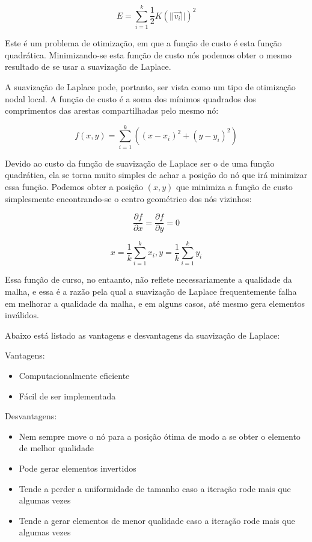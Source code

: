 \begin{equation*}
    E = \sum_{i=1}^k \frac{1}{2} K (||\vec{v_i}||)^2
\end{equation*}

Este é um problema de otimização, em que a função de custo é esta função quadrática. Minimizando-se esta função de custo nós podemos obter o mesmo resultado de se usar a suavização de Laplace.


A suavização de Laplace pode, portanto, ser vista como um tipo de otimização nodal local. A função de custo é a soma dos mínimos quadrados dos comprimentos das arestas compartilhadas pelo mesmo nó:

\begin{equation*}
    f(x,y) = \sum_{i=1}^k ((x-x_i)^2 + (y-y_i)^2)
\end{equation*}

Devido ao custo da função de suavização de Laplace ser o de uma função quadrática, ela se torna muito simples de achar a posição do nó que irá minimizar essa função. Podemos obter a posição $(x,y)$ que minimiza a função de custo simplesmente encontrando-se o centro geométrico dos nós vizinhos:

\begin{equation*}
    \frac{\partial f}{\partial x} = \frac{\partial f}{\partial y} = 0
\end{equation*}

\begin{equation*}
    x = \frac{1}{k} \sum_{i=1}^k x_i, y = \frac{1}{k} \sum_{i=1}^k y_i
\end{equation*}

Essa função de curso, no entaanto, não reflete necessariamente a qualidade da malha, e essa é a razão pela qual a suavização de Laplace frequentemente falha em melhorar a qualidade da malha, e em alguns casos, até mesmo gera elementos inválidos.

Abaixo está listado as vantagens e desvantagens da suavização de Laplace:

Vantagens:
\begin{itemize}
    \item Computacionalmente eficiente
    \item Fácil de ser implementada
\end{itemize}

Desvantagens:
\begin{itemize}
    \item Nem sempre move o nó para a posição ótima de modo a se obter o elemento de melhor qualidade
    \item Pode gerar elementos invertidos
    \item Tende a perder a uniformidade de tamanho caso a iteração rode mais que algumas vezes
    \item Tende a gerar elementos de menor qualidade caso a iteração rode mais que algumas vezes
\end{itemize}

